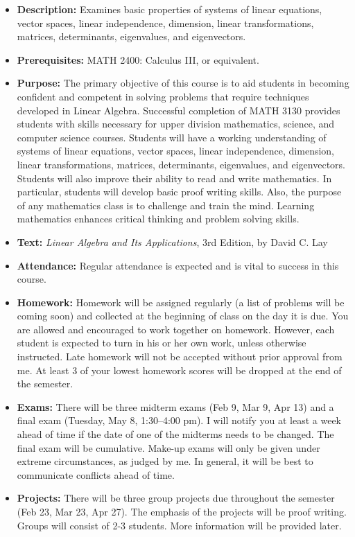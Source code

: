 \documentclass[12pt]{article}
\begin{document}
\begin{itemize}
  \item[] {\bf Description:} Examines basic properties of systems of linear equations, vector spaces, linear independence, dimension, linear transformations, matrices, determinants, eigenvalues, and eigenvectors.
  \item[] {\bf Prerequisites:} MATH 2400: Calculus III, or equivalent.
  \item[] {\bf Purpose:} The primary objective of this course is to aid students in becoming confident and competent in solving problems that require techniques developed in Linear Algebra.  Successful completion of MATH 3130 provides students with skills necessary for upper division mathematics, science, and computer science courses.  Students will have a working understanding of systems of linear equations, vector spaces, linear independence, dimension, linear transformations, matrices, determinants, eigenvalues, and eigenvectors.  Students will also improve their ability to read and write mathematics.  In particular, students will develop basic proof writing skills.  Also, the purpose of any mathematics class is to challenge and train the mind.  Learning mathematics enhances critical thinking and problem solving skills.
  \item[] {\bf Text:} {\it Linear Algebra and Its Applications}, 3rd Edition, by David C. Lay
  \item[] {\bf Attendance:}  Regular attendance is expected and is vital to success in this course.
  \item[] {\bf Homework:}  Homework will be assigned regularly (a list of problems will be coming soon) and collected at the beginning of class on the day it is due. You are allowed and encouraged to work together on homework.  However, each student is expected to turn in his or her own work, unless otherwise instructed.  Late homework will not be accepted without prior approval from me.  At least 3 of your lowest homework scores will be dropped at the end of the semester. 
  \item[] {\bf Exams:} There will be three midterm exams (Feb 9, Mar 9, Apr 13) and a final exam (Tuesday, May 8, 1:30--4:00 pm).  I will notify you at least a week ahead of time if the date of one of the midterms needs to be changed.  The final exam will be cumulative.  Make-up exams will only be given under extreme circumstances, as judged by me.  In general, it will be best to communicate conflicts ahead of time.
  \item[] {\bf Projects:}  There will be three group projects due throughout the semester (Feb 23, Mar 23, Apr 27). The emphasis of the projects will be proof writing.  Groups will consist of 2-3 students.  More information will be provided later.

\end{itemize}
\end{document}
